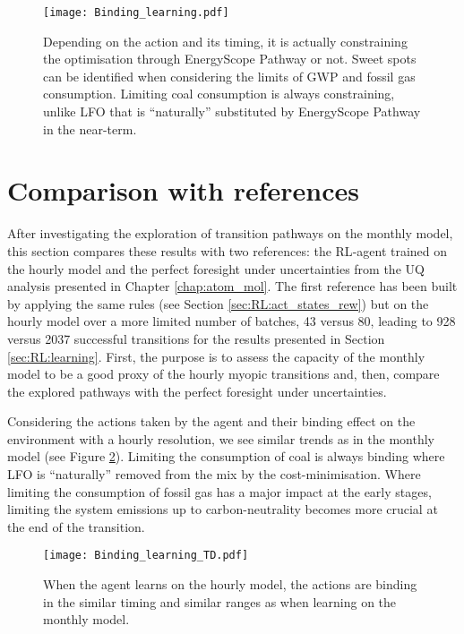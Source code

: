 \begin{figure}[!htbp]
\centering
\texttt{[image: Binding\_learning.pdf]}
\caption{Depending on the action and its timing, it is actually constraining the optimisation through EnergyScope Pathway or not. Sweet spots can be identified when considering the limits of \gls{GWP} and fossil gas consumption. Limiting coal consumption is always constraining, unlike \gls{LFO} that is ``naturally'' substituted by EnergyScope Pathway in the near-term.}
\label{fig:Binding_learning}
\end{figure}

\section{Comparison with references}
\label{sec:RL:testing}
After investigating the exploration of transition pathways on the monthly model, this section compares these results with two references: the \gls{RL}-agent trained on the hourly model and the perfect foresight under uncertainties from the \gls{UQ} analysis presented in Chapter \ref{chap:atom_mol}. The first reference has been built by applying the same rules (see Section \ref{sec:RL:act_states_rew}) but on the hourly model over a more limited number of batches, 43 versus 80, leading to 928 versus 2037 successful transitions for the results presented in Section \ref{sec:RL:learning}. First, the purpose is to assess the capacity of the monthly model to be a good proxy of the hourly myopic transitions and, then,  compare the explored pathways with the perfect foresight under uncertainties.

Considering the actions taken by the agent and their binding effect on the environment with a hourly resolution,  we see similar trends as in the monthly model (see Figure \ref{fig:Binding_learning_TD}). Limiting the consumption of coal is always binding where \gls{LFO} is ``naturally'' removed from the mix by the cost-minimisation. Where limiting the consumption of fossil gas has a major impact at the early stages, limiting the system emissions up to carbon-neutrality becomes more crucial at the end of the transition.

\begin{figure}[!htbp]
\centering
\texttt{[image: Binding\_learning\_TD.pdf]}
\caption{When the agent learns on the hourly model, the actions are binding in the similar timing and similar ranges as when learning on the monthly model. }
\label{fig:Binding_learning_TD}
\end{figure}

